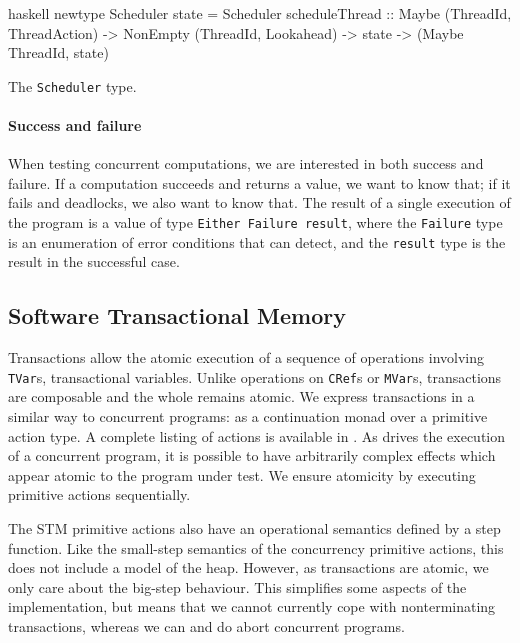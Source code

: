 \begin{listing}
\centering
\begin{cminted}{haskell}
newtype Scheduler state = Scheduler
  { scheduleThread
    :: Maybe (ThreadId, ThreadAction)
    -> NonEmpty (ThreadId, Lookahead)
    -> state
    -> (Maybe ThreadId, state)
  }
\end{cminted}
\caption{The \dejafu{} \texttt{Scheduler} type.}\label{lst:scheduler}
\end{listing}

\paragraph{Success and failure}
When testing concurrent computations, we are interested in both
success and failure.  If a computation succeeds and returns a value,
we want to know that; if it fails and deadlocks, we also want to know
that.  The result of a single execution of the program is a value of
type \verb|Either Failure result|, where the \verb|Failure| type is an
enumeration of error conditions that \dejafu{} can detect, and the
\verb|result| type is the result in the successful case.

\subsection{Software Transactional Memory}

Transactions allow the atomic execution of a sequence of operations
involving \verb|TVar|s, transactional variables.  Unlike operations on
\verb|CRef|s or \verb|MVar|s, transactions are composable and the
whole remains atomic.  We express transactions in a similar way to
concurrent programs: as a continuation monad over a primitive action
type.  A complete listing of actions is available in
.  As \dejafu{} drives the execution of a concurrent
program, it is possible to have arbitrarily complex effects which
appear atomic to the program under test.  We ensure atomicity by
executing primitive actions sequentially.

The STM primitive actions also have an operational semantics defined
by a step function.  Like the small-step semantics of the concurrency
primitive actions, this does not include a model of the heap.
However, as transactions are atomic, we only care about the big-step
behaviour.  This simplifies some aspects of the implementation, but
means that we cannot currently cope with nonterminating transactions,
whereas we can and do abort concurrent programs.

